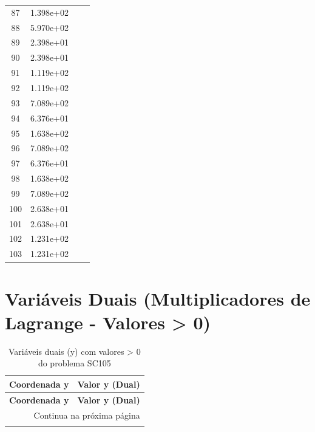\documentclass[12pt]{article}
\begin{document}
\begin{longtable}{@{}cccc@{}}
87 & 1.398e+02 &  &  \\
88 & 5.970e+02 &  &  \\
89 & 2.398e+01 &  &  \\
90 & 2.398e+01 &  &  \\
91 & 1.119e+02 &  &  \\
92 & 1.119e+02 &  &  \\
93 & 7.089e+02 &  &  \\
94 & 6.376e+01 &  &  \\
95 & 1.638e+02 &  &  \\
96 & 7.089e+02 &  &  \\
97 & 6.376e+01 &  &  \\
98 & 1.638e+02 &  &  \\
99 & 7.089e+02 &  &  \\
100 & 2.638e+01 &  &  \\
101 & 2.638e+01 &  &  \\
102 & 1.231e+02 &  &  \\
103 & 1.231e+02 &  &  \\

\bottomrule
\end{longtable}


\section{Variáveis Duais (Multiplicadores de Lagrange - Valores > 0)}

\begin{longtable}{@{}cc@{}}
\caption{Variáveis duais (y) com valores > 0 do problema SC105} \\
\toprule
\textbf{Coordenada y} & \textbf{Valor y (Dual)} \\
\midrule
\endfirsthead

\toprule
\textbf{Coordenada y} & \textbf{Valor y (Dual)} \\
\midrule
\endhead

\midrule \multicolumn{2}{r}{{Continua na próxima página}} \\ \midrule
\endfoot

\bottomrule
\endlastfoot

\bottomrule
\end{longtable}
\end{document}
